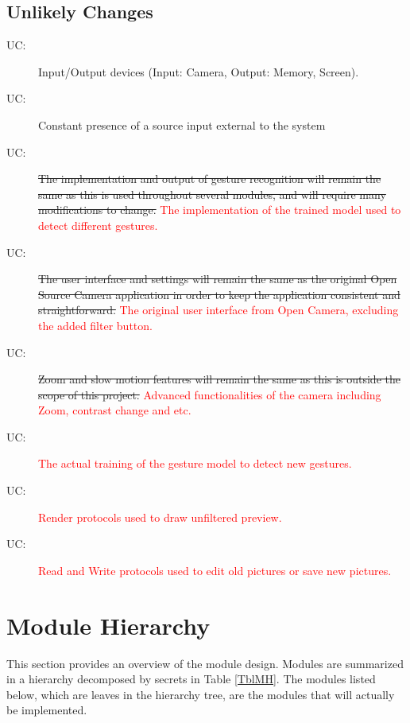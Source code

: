 \documentclass[12pt, titlepage]{article}
\newcounter{ucnum}
\newcommand{\uctheucnum}{UC\theucnum}
\begin{document}
\subsection{Unlikely Changes} \label{SecUchange}

\begin{description}
\item[ \uctheucnum :] Input/Output devices
  (Input: Camera, Output: Memory, Screen).
\item[ \uctheucnum :] Constant presence of a source input external to the system
\item[ \uctheucnum :] \sout{The implementation and output of gesture recognition will remain the same as this is used throughout several modules, and will require many modifications to change.} \textcolor{red}{The implementation of the trained model used to detect different gestures.}
\item[ \uctheucnum :] \sout{The user interface and settings will remain the same as the original Open Source Camera application in order to keep the application consistent and straightforward.} \textcolor{red}{The original user interface from Open Camera, excluding the added filter button.}
\item[ \uctheucnum :] \sout{Zoom and slow motion features will remain the same as this is outside the scope of this project.} \textcolor{red}{Advanced functionalities of the camera including Zoom, contrast change and etc. }
\item[ \uctheucnum :] \textcolor{red}{The actual training of the  gesture model to detect new gestures. }
\item[ \uctheucnum :] \textcolor{red}{Render protocols used to draw unfiltered preview. }
\item[ \uctheucnum :] \textcolor{red}{Read and Write protocols used to edit old pictures or save new pictures. }
\end{description}

\section{Module Hierarchy} \label{SecMH}

This section provides an overview of the module design. Modules are summarized
in a hierarchy decomposed by secrets in Table \ref{TblMH}. The modules listed
below, which are leaves in the hierarchy tree, are the modules that will
actually be implemented.
\end{document}
